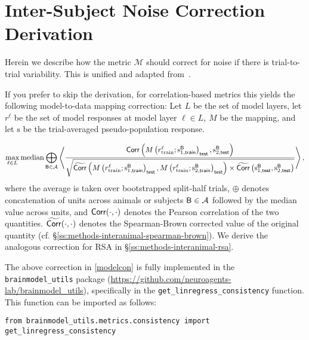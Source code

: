\section{Inter-Subject Noise Correction Derivation}
\label{sec:methods-interanimal}
Herein we describe how the metric $\mathcal{M}$ should correct for noise if there is trial-to-trial variability.
This is unified and adapted from~\citet{nayebi2021unsupervised,nayebi2021explaining,nayebi2023neural}.

If you prefer to skip the derivation, for correlation-based metrics this yields the following model-to-data mapping correction: Let $L$ be the set of model layers, let $r^{\ell}$ be the set of model responses at model layer $\ell \in L$, $M$ be the mapping, and let $\mathrm{s}$ be the trial-averaged pseudo-population response.

\begin{equation}\label{modelcon}
\begin{split}
\max_{\ell\in L}\operatorname*{median}\bigoplus_{\mathsf{B} \in \mathcal{A}} \left\langle\dfrac{\operatorname{\mathsf{Corr}}\left(M\left(r^{\ell}_{\text{train}};\operatorname{s^{\mathsf{B}}_{1,\operatorname{\mathsf{train}}}}\right)_{\operatorname{\mathsf{test}}}, \operatorname{s^{\mathsf{B}}_{2,\operatorname{\mathsf{test}}}}\right)}{\sqrt{\widetilde{\operatorname{\mathsf{Corr}}}\left(M\left(r^{\ell}_{\text{train}};\operatorname{s^{\mathsf{B}}_{1,\operatorname{\mathsf{train}}}}\right)_{\operatorname{\mathsf{test}}}, M\left(r^{\ell}_{\text{train}};\operatorname{s^{\mathsf{B}}_{2,\operatorname{\mathsf{train}}}}\right)_{\operatorname{\mathsf{test}}}\right) \times \widetilde{\operatorname{\mathsf{Corr}}}\left(\operatorname{s^{\mathsf{B}}_{1,\operatorname{\mathsf{test}}}}, \operatorname{s^{\mathsf{B}}_{2,\operatorname{\mathsf{test}}}}\right)}}\right\rangle,
\end{split}
\end{equation}
where the average is taken over bootstrapped split-half trials, $\oplus$ denotes concatenation of units across animals or subjects $\mathsf{B} \in \mathcal{A}$ followed by the median value across units, and $\operatorname{\mathsf{Corr}}(\cdot,\cdot)$ denotes the Pearson correlation of the two quantities.
$\widetilde{\operatorname{\mathsf{Corr}}}(\cdot, \cdot)$ denotes the Spearman-Brown corrected value of the original quantity (cf. \S\ref{ss:methods-interanimal-spearman-brown}).
We derive the analogous correction for RSA in \S\ref{ss:methods-interanimal-rsa}.

The above correction in \eqref{modelcon} is fully implemented in the 
\texttt{brainmodel\_utils} package (\url{https://github.com/neuroagents-lab/brainmodel_utils}), 
specifically in the \texttt{get\_linregress\_consistency} function. 
This function can be imported as follows:

\begin{lstlisting}
from brainmodel_utils.metrics.consistency import get_linregress_consistency
\end{lstlisting}

